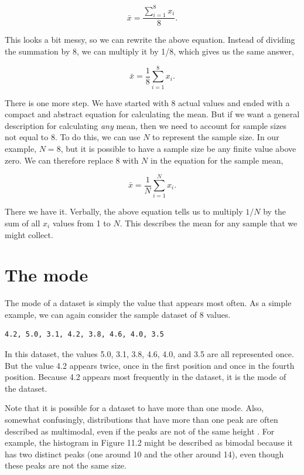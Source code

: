 \documentclass[
  openany]{krantz}
\begin{document}
\[\bar{x} = \frac{\sum_{i = 1}^{8}x_{i}}{8}.\]

This looks a bit messy, so we can rewrite the above equation.
Instead of dividing the summation by 8, we can multiply it by 1/8, which gives us the same answer,

\[\bar{x} = \frac{1}{8}\sum_{i = 1}^{8}x_{i}.\]

There is one more step.
We have started with 8 actual values and ended with a compact and abstract equation for calculating the mean.
But if we want a general description for calculating \emph{any} mean, then we need to account for sample sizes not equal to 8.
To do this, we can use \(N\) to represent the sample size.
In our example, \(N = 8\), but it is possible to have a sample size be any finite value above zero.
We can therefore replace 8 with \(N\) in the equation for the sample mean,

\[\bar{x} = \frac{1}{N}\sum_{i = 1}^{N}x_{i}.\]

There we have it.
Verbally, the above equation tells us to multiply \(1/N\) by the sum of all \(x_{i}\) values from 1 to \(N\).
This describes the mean for any sample that we might collect.

\hypertarget{the-mode}{%
\section{The mode}\label{the-mode}}

The mode of a dataset is simply the value that appears most often.
As a simple example, we can again consider the sample dataset of 8 values.

\begin{verbatim}
4.2, 5.0, 3.1, 4.2, 3.8, 4.6, 4.0, 3.5
\end{verbatim}

In this dataset, the values 5.0, 3.1, 3.8, 4.6, 4.0, and 3.5 are all represented once.
But the value 4.2 appears twice, once in the first position and once in the fourth position.
Because 4.2 appears most frequently in the dataset, it is the mode of the dataset.

Note that it is possible for a dataset to have more than one mode.
Also, somewhat confusingly, distributions that have more than one peak are often described as multimodal, even if the peaks are not of the same height \citep{Sokal1995}.
For example, the histogram in Figure 11.2 might be described as bimodal because it has two distinct peaks (one around 10 and the other around 14), even though these peaks are not the same size.
\end{document}
